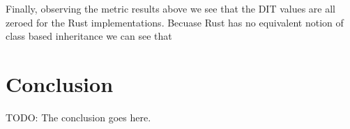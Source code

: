 \documentclass[conference]{IEEEtran}
\begin{document}
Finally, observing the metric results above we see that the DIT values are all zeroed for the Rust implementations.
Becuase Rust has no equivalent notion of class based inheritance we can see that 

\section{Conclusion}
TODO: The conclusion goes here.



%
%
%
%
%

\clearpage






\end{document}
